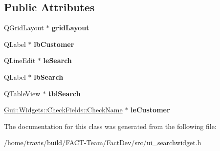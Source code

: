 \subsection*{Public Attributes}
\begin{DoxyCompactItemize}
\item 
\hypertarget{classUi__searchWidget_a1f661ce444bf60d95ced161f114a63e7}{Q\-Grid\-Layout $\ast$ {\bfseries grid\-Layout}}\label{classUi__searchWidget_a1f661ce444bf60d95ced161f114a63e7}

\item 
\hypertarget{classUi__searchWidget_a526465c9917cc9f46280be604c081cf7}{Q\-Label $\ast$ {\bfseries lb\-Customer}}\label{classUi__searchWidget_a526465c9917cc9f46280be604c081cf7}

\item 
\hypertarget{classUi__searchWidget_a3da41ea13f661526b457620ff01f52e2}{Q\-Line\-Edit $\ast$ {\bfseries le\-Search}}\label{classUi__searchWidget_a3da41ea13f661526b457620ff01f52e2}

\item 
\hypertarget{classUi__searchWidget_a6249efa8451a9b688ff89eeb48ab4593}{Q\-Label $\ast$ {\bfseries lb\-Search}}\label{classUi__searchWidget_a6249efa8451a9b688ff89eeb48ab4593}

\item 
\hypertarget{classUi__searchWidget_a5bc39b85d5ab0d8379b3d228a58e63bd}{Q\-Table\-View $\ast$ {\bfseries tbl\-Search}}\label{classUi__searchWidget_a5bc39b85d5ab0d8379b3d228a58e63bd}

\item 
\hypertarget{classUi__searchWidget_ae17f73bd671b59330e264093bdeb357b}{\hyperlink{classGui_1_1Widgets_1_1CheckFields_1_1CheckName}{Gui\-::\-Widgets\-::\-Check\-Fields\-::\-Check\-Name} $\ast$ {\bfseries le\-Customer}}\label{classUi__searchWidget_ae17f73bd671b59330e264093bdeb357b}

\end{DoxyCompactItemize}


The documentation for this class was generated from the following file\-:\begin{DoxyCompactItemize}
\item 
/home/travis/build/\-F\-A\-C\-T-\/\-Team/\-Fact\-Dev/src/ui\-\_\-searchwidget.\-h\end{DoxyCompactItemize}
